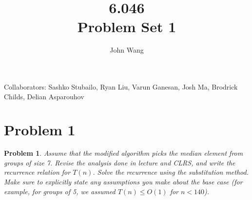 \documentclass[psamsfonts]{amsart}
\title{6.046 \\
Problem Set 1}
\author{John Wang}
\newtheorem{prob}{Problem}[section]
\theoremstyle{definition}
\theoremstyle{remark}
\numberwithin{equation}{section}
\begin{document}
\maketitle

Collaborators: Sashko Stubailo, Ryan Liu, Varun Ganesan, Josh Ma, Brodrick Childs, Delian Asparouhov

\section{Problem 1}

\begin{prob}
Assume that the modified algorithm picks the median element from groups of size 7.
Revise the analysis done in lecture and CLRS, and write the recurrence relation for
$T(n)$. Solve the recurrence using the substitution method. Make sure to explicitly
state any assumptions you make about the base case (for example, for groups of 5, we
assumed $T(n) \leq O(1)$ for $n < 140$).
\end{prob}
\end{document}

